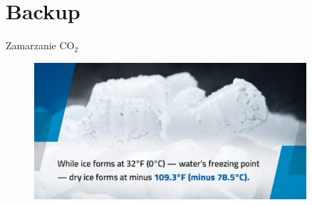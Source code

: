 \appendix
\section*{Backup}

\begin{frame}{Zamarzanie CO$_2$}
    \begin{figure}
        \centering
        \includegraphics[width=0.9\textwidth, frame]{images/dry_ice_freezing_temp.jpg}
    \end{figure}
\end{frame}